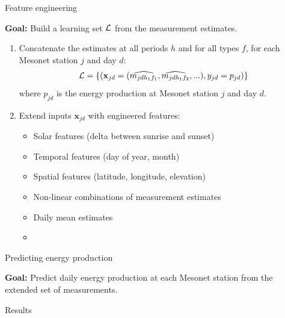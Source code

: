 \documentclass[handout]{beamer}
\begin{document}
\begin{frame}{Feature engineering}

\textbf{Goal:} Build a learning set ${\cal L}$ from the measurement estimates.

\begin{enumerate}

\item Concatenate the estimates at all periods $h$ and for all types $f$, for
each Mesonet station $j$ and day $d$:
$${\cal L} = \{ (\mathbf{x}_{jd} = (\widehat{m_{jd{h_1}{f_1}}}, \widehat{m_{jd{h_1}{f_2}}}, ...), y_{jd} = p_{jd}) \}$$
where $p_{jd}$ is the energy production at Mesonet station $j$ and day $d$.

\item Extend inputs $\mathbf{x}_{jd}$ with engineered features:
\begin{itemize}
\item Solar features (delta between sunrise and sunset)
\item Temporal features (day of year, month)
\item Spatial features (latitude, longitude, elevation)
\item Non-linear combinations of measurement estimates
\item Daily mean estimates
\item
\end{itemize}

\end{enumerate}

\end{frame}



\begin{frame}{Predicting energy production}

\textbf{Goal:} Predict daily energy production at each Mesonet station from the
extended set of measurements.


\end{frame}



\begin{frame}{Results}

\end{frame}
\end{document}
